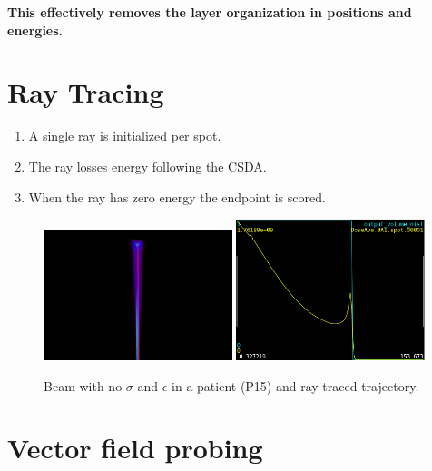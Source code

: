 \documentclass{article}
\begin{document}
\textbf{This effectively removes the layer organization in positions and energies.}

\section{Ray Tracing}

\begin{enumerate}
    \item A single ray is initialized per spot.
    \item The ray losses energy following the CSDA.
    \item When the ray has zero energy the endpoint is scored.
\end{enumerate}

\begin{figure}[h]
    \includegraphics[width=0.49\textwidth]{beam.png}
    \includegraphics[width=0.49\textwidth]{profile.png}
    \caption{Beam with no $\sigma$ and $\epsilon$ in a patient (P15) and ray traced trajectory.}
\end{figure}

\section{Vector field probing}
\end{document}
